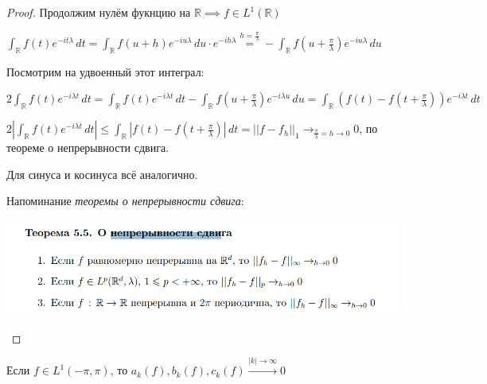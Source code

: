 \begin{proof}
    Продолжим нулём фукнцию на $\mathbb{R} \implies f \in L^1 (\mathbb{R})$

    $\int_{\mathbb{R}} f(t) e^{-i t \lambda} \, dt = \int_{\mathbb{R}} f(u + h) e^{-iu\lambda} \, du \cdot  e^{-ih\lambda} \overset{h = \frac{\pi}{\lambda}}{=} - \int_{\mathbb{R}} f(u + \frac{\pi}{\lambda}) e^{-iu\lambda} \, du$

    Посмотрим на удвоенный этот интеграл:

    $2 \int_{\mathbb{R}} f(t) e^{-i \lambda t} \, dt = \int_{\mathbb{R}} f(t) e^{-i \lambda t} \, dt - \int_{\mathbb{R}} f(u + \frac{\pi}{\lambda}) e^{-i\lambda u} \, du = \int_{\mathbb{R}} (f(t) - f(t + \frac{\pi}{\lambda})) e^{-i \lambda t} \, dt $

    $2 \left | \int_{\mathbb{R}} f(t) e^{-i \lambda t} \, dt \right | \leqslant \int_{\mathbb{R}} \left | f(t) - f(t + \frac{\pi}{\lambda}) \right | \, dt = || f - f_h ||_1 \rightarrow_{\frac{\pi}{\lambda} = h \to 0} 0$, по теореме о непрерывности сдвига.

    Для синуса и косинуса всё аналогично.


    Напоминание \textit{теоремы о непрерывности сдвига}:

    \begin{center}
        \includegraphics[width=13cm]{assets/05-fourierreihe/shift-continuous.png}
    \end{center}
\end{proof}

\begin{consequence}
    Если $f \in L^1 (-\pi, \pi)$, то $a_k (f), b_k (f), c_k (f) \overset{|k| \to \infty}{\rightarrow} 0$
\end{consequence}

